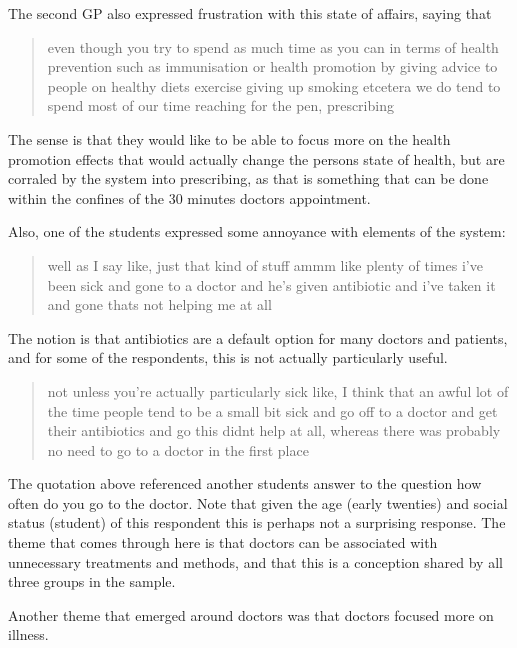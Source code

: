 The second GP also expressed frustration with this state of affairs, saying that 
\begin{quotation}
  even though you try to spend as much time as you can in terms of health prevention such as immunisation or health promotion by giving advice to people on healthy diets exercise giving up smoking etcetera we do tend to spend most of our time reaching for the pen, prescribing 

\end{quotation}

The sense is that they would like to be able to focus more on the health promotion effects that would actually change the persons state of health, but are corraled by the system into prescribing, as that is something that can be done within the confines of the 30 minutes doctors appointment. 

Also, one of the students expressed some annoyance with elements of the system: 
\begin{quotation}
  well as I say like, just that kind of stuff ammm like plenty of times i've been sick and gone to a doctor and he's given antibiotic and i've taken it and gone thats not helping me at all 

\end{quotation}

The notion is that antibiotics are a default option for many doctors and patients, and for some of the respondents, this is not actually particularly useful. 

\begin{quotation}
not unless you're actually particularly sick like, I think that an awful lot of the time people tend to be a small bit sick and go off to a doctor and get their antibiotics and go this didnt help at all, whereas there was probably no need to go to a doctor in the first place 

\end{quotation}

The quotation above referenced another students answer to the question how often do you go to the doctor. Note that given the age (early twenties) and social status (student) of this respondent this is perhaps not a surprising response.  The theme that comes through here is that doctors can be associated with unnecessary treatments and methods, and that this is a conception shared by all three groups in the sample. 


Another theme that emerged around doctors was that doctors focused more on illness. 

